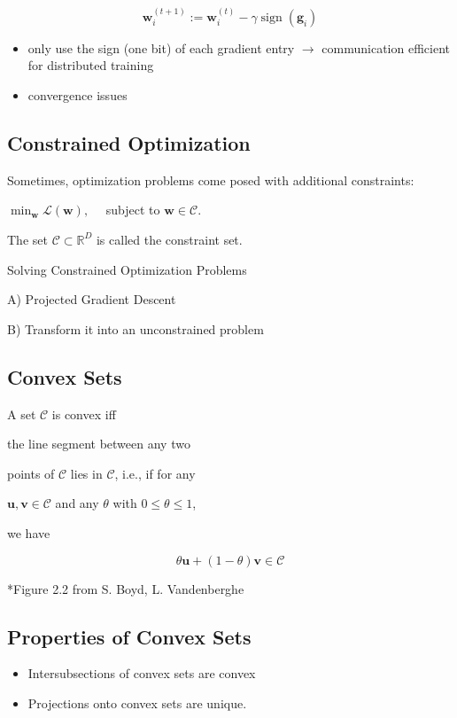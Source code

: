 $$
\mathbf{w}_{i}^{(t+1)}:=\mathbf{w}_{i}^{(t)}-\gamma \operatorname{sign}\left(\mathbf{g}_{i}\right)
$$

\begin{itemize}
  \item only use the sign (one bit) of each gradient entry $\rightarrow$ communication efficient for distributed training
  \item convergence issues
\end{itemize}

\subsection*{Constrained Optimization}
Sometimes, optimization problems come posed with additional constraints:

$\min _{\mathbf{w}} \mathcal{L}(\mathbf{w}), \quad$ subject to $\mathbf{w} \in \mathcal{C}$.

The set $\mathcal{C} \subset \mathbb{R}^{D}$ is called the constraint set.

Solving Constrained Optimization Problems

A) Projected Gradient Descent

B) Transform it into an unconstrained problem

\subsection*{Convex Sets}
A set $\mathcal{C}$ is convex iff

the line segment between any two

points of $\mathcal{C}$ lies in $\mathcal{C}$, i.e., if for any

$\mathbf{u}, \mathbf{v} \in \mathcal{C}$ and any $\theta$ with $0 \leq \theta \leq 1$,

we have

$$
\theta \mathbf{u}+(1-\theta) \mathbf{v} \in \mathcal{C}
$$


*Figure 2.2 from S. Boyd, L. Vandenberghe

\subsection*{Properties of Convex Sets}
\begin{itemize}
  \item Intersubsections of convex sets are convex
  \item Projections onto convex sets are unique.
\end{itemize}

